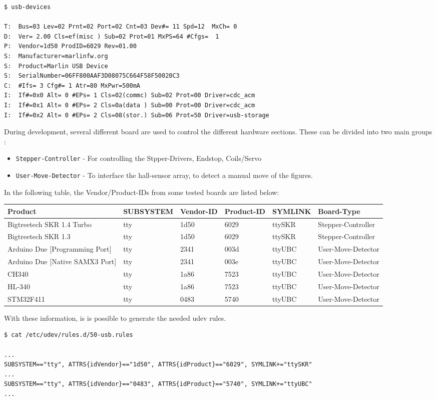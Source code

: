 \begin{lstlisting}
$ usb-devices

T:  Bus=03 Lev=02 Prnt=02 Port=02 Cnt=03 Dev#= 11 Spd=12  MxCh= 0
D:  Ver= 2.00 Cls=ef(misc ) Sub=02 Prot=01 MxPS=64 #Cfgs=  1
P:  Vendor=1d50 ProdID=6029 Rev=01.00
S:  Manufacturer=marlinfw.org 
S:  Product=Marlin USB Device
S:  SerialNumber=06FF800AAF3D08075C664F58F50020C3
C:  #Ifs= 3 Cfg#= 1 Atr=80 MxPwr=500mA
I:  If#=0x0 Alt= 0 #EPs= 1 Cls=02(commc) Sub=02 Prot=00 Driver=cdc_acm
I:  If#=0x1 Alt= 0 #EPs= 2 Cls=0a(data ) Sub=00 Prot=00 Driver=cdc_acm
I:  If#=0x2 Alt= 0 #EPs= 2 Cls=08(stor.) Sub=06 Prot=50 Driver=usb-storage
\end{lstlisting}

During development, several different board are used to control the
different hardware sections. These can be divided into two main groups :

\begin{itemize}
\tightlist
\item
  \passthrough{\lstinline!Stepper-Controller!} - For controlling the
  Stpper-Drivers, Endstop, Coils/Servo
\item
  \passthrough{\lstinline!User-Move-Detector!} - To interface the
  hall-sensor array, to detect a manual move of the figures.
\end{itemize}

In the following table, the Vendor/Product-IDs from some tested boards
are listed below:

\begin{longtable}[]{@{}llllll@{}}
\toprule
Product & SUBSYSTEM & Vendor-ID & Product-ID & SYMLINK &
Board-Type\tabularnewline
\midrule
\endhead
Bigtreetech SKR 1.4 Turbo & tty & 1d50 & 6029 & ttySKR &
Stepper-Controller\tabularnewline
Bigtreetech SKR 1.3 & tty & 1d50 & 6029 & ttySKR &
Stepper-Controller\tabularnewline
Arduino Due {[}Programming Port{]} & tty & 2341 & 003d & ttyUBC &
User-Move-Detector\tabularnewline
Arduino Due {[}Native SAMX3 Port{]} & tty & 2341 & 003e & ttyUBC &
User-Move-Detector\tabularnewline
CH340 & tty & 1a86 & 7523 & ttyUBC & User-Move-Detector\tabularnewline
HL-340 & tty & 1a86 & 7523 & ttyUBC & User-Move-Detector\tabularnewline
STM32F411 & tty & 0483 & 5740 & ttyUBC &
User-Move-Detector\tabularnewline
\bottomrule
\end{longtable}

With these information, is is possible to generate the needed udev
rules.

\begin{lstlisting}
$ cat /etc/udev/rules.d/50-usb.rules

...
SUBSYSTEM=="tty", ATTRS{idVendor}=="1d50", ATTRS{idProduct}=="6029", SYMLINK+="ttySKR"
...
SUBSYSTEM=="tty", ATTRS{idVendor}=="0483", ATTRS{idProduct}=="5740", SYMLINK+="ttyUBC"
...
\end{lstlisting}

